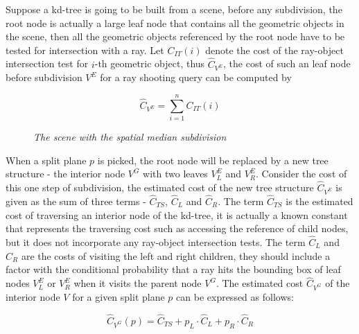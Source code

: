 Suppose a kd-tree is going to be built from a scene, before any subdivision, the root node is actually a large leaf node that contains all the geometric objects in the scene, then all the geometric objects referenced by the root node have to be tested for intersection with a ray. Let \( C_{IT}(i) \) denote the cost of the ray-object intersection test for \(i\)-th geometric object, thus \( \hat{C}_{V^{E}} \), the cost of such an leaf node before subdivision \( V^{E} \) for a ray shooting query can be computed by

\begin{equation} 
    \label{eg:CostLeafNode}
    \hat{C}_{V^{E}} = \sum_{i=1}^{n} C_{IT}(i)
\end{equation}

\begin{figure}[htp] 
    \centering 
    \label{fig:SpatialMedianSubdivision} 
    \renewcommand{\thefigure}{\thechapter.\arabic{figure}}
    \caption[The scene with the spatial median subdivision]{\emph{ The scene with the spatial median subdivision}}
\end{figure}

When a split plane \( p \) is picked, the root node will be replaced by a new tree structure - the interior node \( V^{G} \) with two leaves \(V^{E}_{L} \) and \( V^{E}_{R} \). Consider the cost of this one step of subdivision, the estimated cost of the new tree structure \( \hat{C}_{V^{E}} \) is given as the sum of three terms - \( \hat{C}_{TS} \), \( \hat{C}_{L} \) and \( \hat{C}_{R} \). The term \( \hat{C}_{TS} \) is the estimated cost of traversing an interior node of the kd-tree, it is actually a known constant that represents the traversing cost such as accessing the reference of child nodes, but it does not incorporate any ray-object intersection tests. The term \( \hat{C}_{L} \) and \( \hat{C}_{R} \) are the costs of visiting the left and right children, they should include a factor with the conditional probability that a ray hits the bounding box of leaf nodes \( V^{E}_{L} \) or  \( V^{E}_{R} \) when it visits the parent node \( V^{G} \). The estimated cost \( \hat{C}_{V^{G}} \) of the interior node \( V \) for a given split plane \( p \) can be expressed as follows: 

\begin{equation} 
    \label{eq:CostOneStep}
    \hat{C}_{V^{G}}(p) = \hat{C}_{TS} + p_{L} \cdot \hat{C}_{L} + p_{R} \cdot \hat{C}_{R} 
\end{equation}

